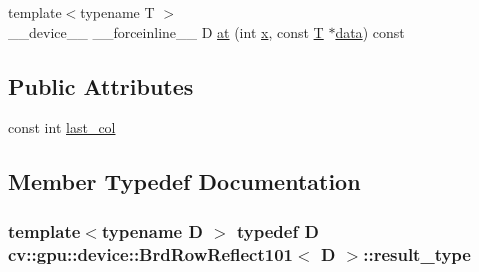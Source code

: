 \begin{DoxyCompactItemize}
\item 
{\footnotesize template$<$typename T $>$ }\\\-\_\-\-\_\-device\-\_\-\-\_\- \-\_\-\-\_\-forceinline\-\_\-\-\_\- D \hyperlink{structcv_1_1gpu_1_1device_1_1BrdRowReflect101_a31bdb2051333f64c83bfa6b37e67d715}{at} (int \hyperlink{highgui__c_8h_a6150e0515f7202e2fb518f7206ed97dc}{x}, const \hyperlink{calib3d_8hpp_a3efb9551a871ddd0463079a808916717}{T} $\ast$\hyperlink{legacy_8hpp_ab9fe6c09e6d02865a953fffc12fe6ca0}{data}) const 
\end{DoxyCompactItemize}
\subsection*{Public Attributes}
\begin{DoxyCompactItemize}
\item 
const int \hyperlink{structcv_1_1gpu_1_1device_1_1BrdRowReflect101_ac23b2ff877ab27e060f673fca28eb0d3}{last\-\_\-col}
\end{DoxyCompactItemize}


\subsection{Member Typedef Documentation}
\hypertarget{structcv_1_1gpu_1_1device_1_1BrdRowReflect101_a93315369093ec55b9b390b00a2c6c6cb}{
\subsubsection[{result\-\_\-type}]{\setlength{\rightskip}{0pt plus 5cm}template$<$typename D $>$ typedef D {\bf cv\-::gpu\-::device\-::\-Brd\-Row\-Reflect101}$<$ D $>$\-::{\bf result\-\_\-type}}}\label{structcv_1_1gpu_1_1device_1_1BrdRowReflect101_a93315369093ec55b9b390b00a2c6c6cb}


